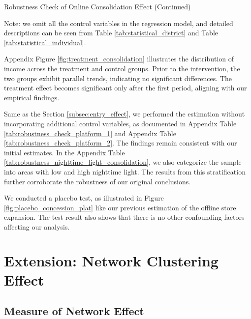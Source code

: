 \documentclass[11pt]{article}
\begin{document}
\begin{table}
  \begin{center}
    \begin{scriptsize}
      \caption{Robustness Check of Online Consolidation Effect (Continued)}
      \label{tab:heter_platform_did_2}
      
    
    Note: we omit all the control variables in the regression model, and detailed descriptions can be seen from Table \ref{tab:statistical_district} and Table \ref{tab:statistical_individual}.
    \end{scriptsize}
  \end{center}
\end{table}

Appendix Figure \ref{fig:treatment_consolidation} illustrates the distribution of income across the treatment and control groups. Prior to the intervention, the two groups exhibit parallel trends, indicating no significant differences. The treatment effect becomes significant only after the first period, aligning with our empirical findings. 

Same as the Section \ref{subsec:entry_effect}, we performed the estimation without incorporating additional control variables, as documented in Appendix Table \ref{tab:robustness_check_platform_1} and Appendix Table \ref{tab:robustness_check_platform_2}. The findings remain consistent with our initial estimates. In the Appendix Table \ref{tab:robustness_nighttime_light_consolidation}, we also categorize the sample into areas with low and high nighttime light. The results from this stratification further corroborate the robustness of our original conclusions.

We conducted a placebo test, as illustrated in Figure \ref{fig:placebo_concession_plat} like our previous estimation of the offline store expansion. The test result also shows that there is no other confounding factors affecting our analysis. 

\section{Extension: Network Clustering Effect} \label{sec:network_effect}

\subsection{Measure of Network Effect} \label{subsec:measure_network_effect}
\end{document}
